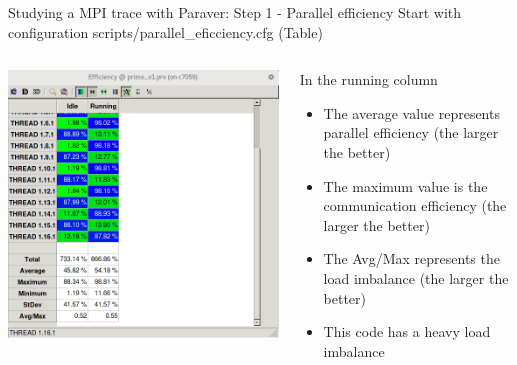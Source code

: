 \documentclass[10pt,xcolor=table]{beamer}
\begin{document}
\begin{frame}{Studying a MPI trace with Paraver: Step 1 - Parallel efficiency}
Start with configuration scripts/parallel\_eficciency.cfg (Table)

\begin{columns}
\begin{column}{0.5\textwidth}
  \includegraphics[width=\textwidth]{figs/parallel_efficiency_table.png}
\end{column}
\begin{column}{0.5\textwidth}
In the running column
  \begin{itemize}
      \item The average value represents parallel efficiency (the larger the better)
      \item The maximum value is the communication efficiency (the larger the better)
      \item The Avg/Max represents the load imbalance (the larger the better)
      \item This code has a heavy load imbalance
  \end{itemize}
\end{column}
\end{columns}
\end{frame}
\end{document}
